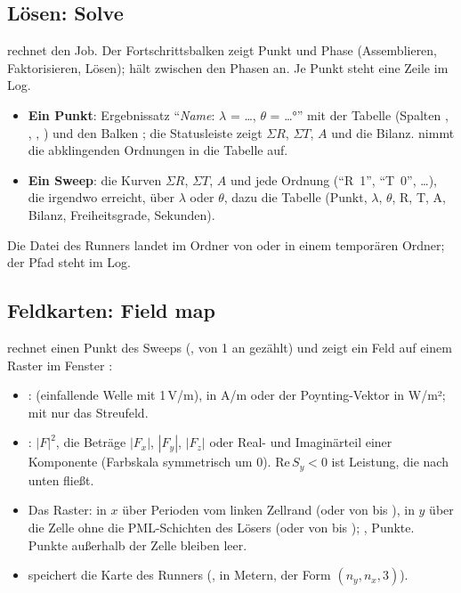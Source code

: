 \subsection{Lösen: Solve}\label{sec:hp-solve}

 rechnet den Job. Der Fortschrittsbalken zeigt Punkt und Phase (Assemblieren,
Faktorisieren, Lösen);  hält zwischen den Phasen an. Je Punkt steht eine Zeile im Log.

\begin{itemize}
  \item \textbf{Ein Punkt}: Ergebnissatz \enquote{\textit{Name}: $\lambda$ = …, $\theta$ = …°} mit der Tabelle
     (Spalten , , , ) und den
    Balken ; die Statusleiste zeigt $\Sigma R$, $\Sigma T$, $A$ und die
    Bilanz.  nimmt die abklingenden Ordnungen in die Tabelle auf.
  \item \textbf{Ein Sweep}: die Kurven $\Sigma R$, $\Sigma T$, $A$ und jede Ordnung
    (\enquote{R~1}, \enquote{T~0}, …), die irgendwo  erreicht, über
    $\lambda$ oder $\theta$, dazu die Tabelle  (Punkt, $\lambda$, $\theta$, R, T, A,
    Bilanz, Freiheitsgrade, Sekunden).
\end{itemize}

Die Datei  des Runners landet im Ordner von  oder
in einem temporären Ordner; der Pfad steht im Log.

\subsection{Feldkarten: Field map}\label{sec:hp-feldkarte}

 rechnet einen Punkt des Sweeps (, von 1 an gezählt) und
zeigt ein Feld auf einem Raster im Fenster :

\begin{itemize}
  \item {}:  (einfallende Welle mit 1\,V/m),  in A/m oder der
    Poynting-Vektor  in W/m²; mit  nur das Streufeld.
  \item {}: $|F|^2$, die Beträge $|F_x|$, $|F_y|$, $|F_z|$ oder Real- und Imaginärteil einer
    Komponente (Farbskala symmetrisch um 0). $\mathrm{Re}\,S_y < 0$ ist Leistung, die nach unten
    fließt.
  \item Das Raster: in $x$ über  Perioden vom linken Zellrand (oder von 
    bis ), in $y$ über die Zelle ohne die PML-Schichten des Lösers (oder von 
    bis ); ,  Punkte. Punkte außerhalb der Zelle bleiben leer.
  \item {} speichert die Karte des Runners (,  in Metern,
     der Form $(n_y, n_x, 3)$).
\end{itemize}

